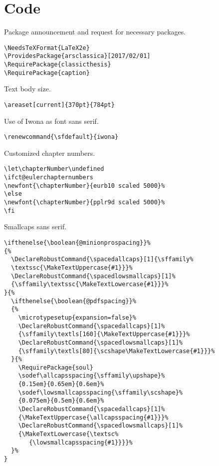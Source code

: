 
\chapter{Code}
\label{chp:code}

\lstset{numbers=left,
    numberstyle=\scriptsize,
    stepnumber=1,
    numbersep=8pt
}



Package announcement and request for necessary packages.
\begin{lstlisting}[firstnumber=1]
\NeedsTeXFormat{LaTeX2e}
\ProvidesPackage{arsclassica}[2017/02/01]
\RequirePackage{classicthesis}
\RequirePackage{caption}
\end{lstlisting}



Text body size.
\begin{lstlisting}
\areaset[current]{370pt}{784pt}
\end{lstlisting}



Use of Iwona as font sans serif.
\begin{lstlisting}
\renewcommand{\sfdefault}{iwona}
\end{lstlisting}



Customized chapter numbers.
\begin{lstlisting}
\let\chapterNumber\undefined
\ifct@eulerchapternumbers
\newfont{\chapterNumber}{eurb10 scaled 5000}%
\else
\newfont{\chapterNumber}{pplr9d scaled 5000}%
\fi
\end{lstlisting}



Smallcaps sans serif.
\begin{lstlisting}
\ifthenelse{\boolean{@minionprospacing}}%
{%
  \DeclareRobustCommand{\spacedallcaps}[1]{\sffamily%
  \textssc{\MakeTextUppercase{#1}}}%
  \DeclareRobustCommand{\spacedlowsmallcaps}[1]%
  {\sffamily\textssc{\MakeTextLowercase{#1}}}%
}{%
  \ifthenelse{\boolean{@pdfspacing}}%
  {%
    \microtypesetup{expansion=false}%
    \DeclareRobustCommand{\spacedallcaps}[1]%
    {\sffamily\textls[160]{\MakeTextUppercase{#1}}}%
    \DeclareRobustCommand{\spacedlowsmallcaps}[1]%
    {\sffamily\textls[80]{\scshape\MakeTextLowercase{#1}}}%
  }{%
    \RequirePackage{soul}
    \sodef\allcapsspacing{\sffamily\upshape}%
    {0.15em}{0.65em}{0.6em}%
    \sodef\lowsmallcapsspacing{\sffamily\scshape}%
    {0.075em}{0.5em}{0.6em}%
    \DeclareRobustCommand{\spacedallcaps}[1]%
    {\MakeTextUppercase{\allcapsspacing{#1}}}%
	\DeclareRobustCommand{\spacedlowsmallcaps}[1]%
	{\MakeTextLowercase{\textsc%
	   {\lowsmallcapsspacing{#1}}}}%
  }%
}
\end{lstlisting}




